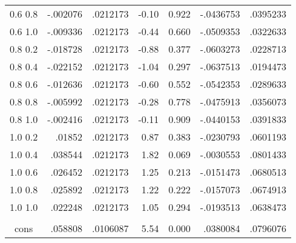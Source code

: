 \begin{tabular}{c|rrrrrr}
 0.6 0.8&-.002076&.0212173&-0.10&0.922&-.0436753&.0395233\\
 0.6 1.0&-.009336&.0212173&-0.44&0.660&-.0509353&.0322633\\
0.8 0.2&-.018728&.0212173&-0.88&0.377&-.0603273&.0228713\\
0.8 0.4&-.022152&.0212173&-1.04&0.297&-.0637513&.0194473\\
0.8 0.6&-.012636&.0212173&-0.60&0.552&-.0542353&.0289633\\
0.8 0.8&-.005992&.0212173&-0.28&0.778&-.0475913&.0356073\\
0.8 1.0&-.002416&.0212173&-0.11&0.909&-.0440153&.0391833\\
 1.0 0.2&.01852&.0212173&0.87&0.383&-.0230793&.0601193\\
 1.0 0.4&.038544&.0212173&1.82&0.069&-.0030553&.0801433\\
 1.0 0.6&.026452&.0212173&1.25&0.213&-.0151473&.0680513\\
 1.0 0.8&.025892&.0212173&1.22&0.222&-.0157073&.0674913\\
 1.0 1.0&.022248&.0212173&1.05&0.294&-.0193513&.0638473\\
\\
cons&.058808&.0106087&5.54&0.000&.0380084&.0796076\\
\hline
\end{tabular}
